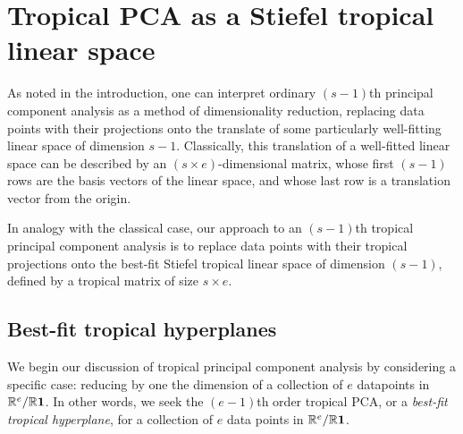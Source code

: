 \documentclass[12pt]{extarticle}
\numberwithin{theorem}{section}
\newcommand{\RR}{\mathbb{R}}
\begin{document}
\begin{comment}
ULTRAMETRICS

Let $e:=\binom m 2$, and let $L_m$ denote the $(m-1)$-dimensional subspace of $\mathbb R^e$ defined by the linear equations $x_{ij} - x_{ik} + x_{jk}=0$ for $1\leq i < j <k \leq m$. 

\end{comment}

\section{Tropical PCA as a Stiefel tropical linear space}\label{trop:lin}

As noted in the introduction, one can interpret ordinary $(s-1)$th principal component analysis as a method of dimensionality reduction, replacing data points with their projections onto the translate of some particularly well-fitting linear space of dimension $s-1$. Classically, this translation of a well-fitted linear space can be described by an $(s\times e)$-dimensional matrix, whose first $(s-1)$ rows are the basis vectors of the linear space, and whose last row is a translation vector from the origin.

In analogy with the classical case, our approach to an $(s-1)$th tropical principal component analysis is to replace data points with their tropical projections onto the best-fit Stiefel tropical linear space of dimension $(s-1)$, defined by a tropical matrix of size $s\times e$.

\subsection{Best-fit tropical hyperplanes}

We begin our discussion of tropical principal component analysis by
considering a specific case: reducing by one the dimension
of a collection of $e$ datapoints in $\RR^e/\RR {\bf 1}$. In other words, we
seek the $(e-1)$th order tropical PCA, or a \emph{best-fit tropical hyperplane}, for a collection of $e$ data points in $\RR^e/\RR {\bf 1}$.
\end{document}
